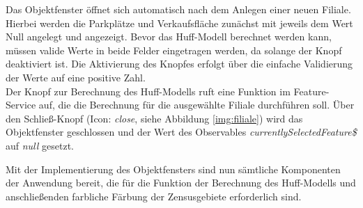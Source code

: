 Das Objektfenster öffnet sich automatisch nach dem Anlegen einer neuen Filiale.
Hierbei werden die Parkplätze und Verkaufsfläche zunächst mit jeweils dem Wert Null angelegt und angezeigt.
Bevor das Huff-Modell berechnet werden kann, müssen valide Werte in beide Felder eingetragen werden, da solange der Knopf deaktiviert ist.
Die Aktivierung des Knopfes erfolgt über die einfache Validierung der Werte auf eine positive Zahl.\\
Der Knopf zur Berechnung des Huff-Modells ruft eine Funktion im Feature-Service auf, die die Berechnung für die ausgewählte Filiale durchführen soll.
Über den Schließ-Knopf (Icon: \emph{close}, siehe Abbildung \ref{img:filiale}) wird das Objektfenster geschlossen und der Wert des Observables \emph{currentlySelectedFeature\$} auf \emph{null} gesetzt.

Mit der Implementierung des Objektfensters sind nun sämtliche Komponenten der Anwendung bereit, die für die Funktion der Berechnung des Huff-Modells und anschließenden farbliche Färbung der Zensusgebiete erforderlich sind.

